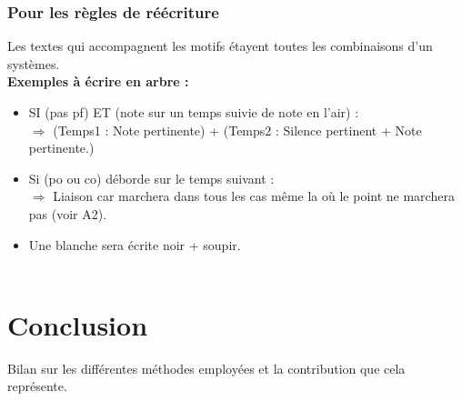 \subsubsection{Pour les règles de réécriture}
Les textes qui accompagnent les motifs étayent toutes les combinaisons d’un systèmes.\\





\textbf{Exemples à écrire en arbre :}\\
\begin{itemize}
	\item 
	SI (pas pf) ET (note sur un temps suivie de note en l’air) :\\
	$\Rightarrow$ (Temps1 : Note pertinente) + (Temps2 : Silence pertinent + Note pertinente.)\\
	\item
	Si (po ou co) déborde sur le temps suivant :\\
	$\Rightarrow$ Liaison car marchera dans tous les cas même la où le point ne marchera pas (voir A2).\\
	\item
	Une blanche sera écrite noir + soupir.\\\\
\end{itemize}

\section*{Conclusion}
Bilan sur les différentes méthodes employées et la contribution que cela représente.